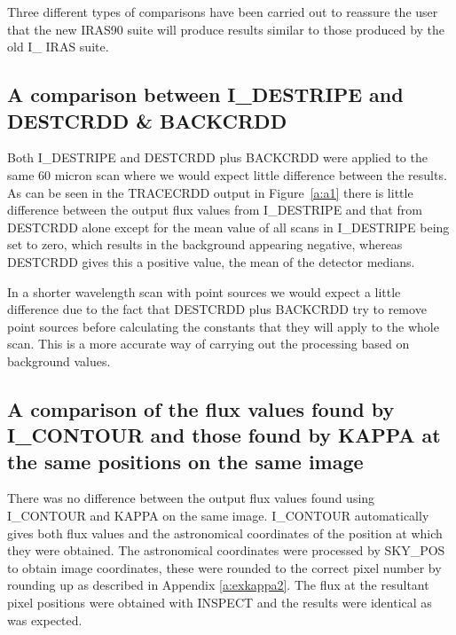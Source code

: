 \documentclass[twoside,11pt]{starlink}
\begin{document}
Three different types of comparisons have been carried out to reassure the user
that the new IRAS90 suite will produce results similar to those produced by
the old  I\_ IRAS suite.

\subsection{A comparison between I\_DESTRIPE and DESTCRDD \& BACKCRDD}

Both I\_DESTRIPE and DESTCRDD plus BACKCRDD were applied to the same 60 micron
scan where we would expect little difference between the results. As can be
seen in the TRACECRDD output in Figure~\ref{a:a1} there is little difference
between the output flux values from I\_DESTRIPE and that from DESTCRDD alone
except for the mean value of all scans in I\_DESTRIPE being set to zero, which
results in the background appearing negative, whereas DESTCRDD gives this a
positive value, the mean of the detector medians.

In a shorter wavelength scan with point sources we would expect a little
difference due to the fact that DESTCRDD plus BACKCRDD try to remove point
sources before calculating the  constants that they will apply to the whole
scan. This is a  more accurate  way of carrying out the processing based on
background values.
\subsection{A comparison of the flux values found by I\_CONTOUR and those found
by KAPPA at the same positions on the same image}
There was no difference between the output flux values found using I\_CONTOUR
and KAPPA on the same image. I\_CONTOUR automatically gives both flux values
and the astronomical coordinates of the position at which they were obtained.
The astronomical coordinates were processed by SKY\_POS to obtain image
coordinates, these were rounded to the correct pixel number by rounding up as
described in Appendix \ref{a:exkappa2}. The flux at the resultant pixel
positions were obtained with INSPECT and the results were identical as was
expected.
\end{document}
